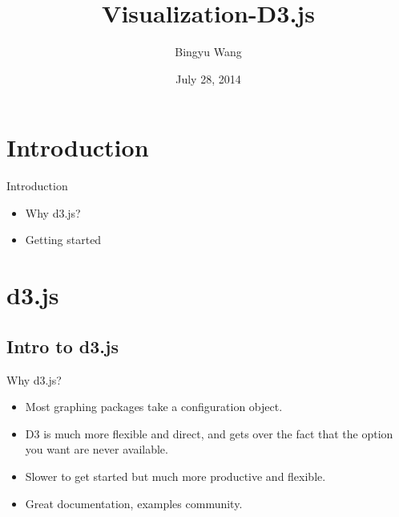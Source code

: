 \documentclass{beamer}
\title[Data Mining]{Visualization-D3.js}
\author{Bingyu Wang}
\institute{Northeastern University}
\date{July 28, 2014}
\begin{document}
\begin{frame}
  \titlepage
\end{frame}


\section{Introduction}

\begin{frame}{Introduction}

\begin{itemize}
  \item Why d3.js? 
  \item Getting started
\end{itemize}

\end{frame}

\section{d3.js}

\subsection{Intro to d3.js}

\begin{frame}{Why d3.js?}

\begin{itemize}
	\item Most graphing packages take a configuration object.
	\item D3 is much more flexible and direct, and gets over the fact that the option you want are never available.
	\item Slower to get started but much more productive and flexible. 
	\item Great documentation, examples community.
\end{itemize}



\end{frame}
\end{document}
